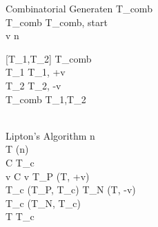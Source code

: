 


\begin{pseudocode}{Combinatorial Generate}{n}
	T_{comb} \GETS \emptyset \\
	T_{comb} \GETS {}T_{comb}, start\text{)} \\ 

	\FOR v   n \DO
		\BEGIN
		
		[T_1,T_2] \GETS {} T_{comb}\text{)}\\
		T_1 \GETS {}T_1, +v \text{)}\\
		T_2 \GETS {}T_2, -v \text{)}\\
		T_{comb} \GETS {}T_1,T_2\text{)}\\
	\END
	\\
\end{pseudocode}


\begin{pseudocode}{Lipton's Algorithm}{\phi}
n  \phi \\

T \GETS {}(n) \\
\FOREACH {} C  \phi \DO
	\BEGIN
	T_c \GETS \emptyset \\
	\FOREACH {} v  C \DO
		\BEGIN
			\IF v  \THEN
				\BEGIN
					T_P \GETS {}(T, +v)\\
					T_c \GETS {}(T_P, T_c)						
				\END
			\ELSE
				\BEGIN
					T_N \GETS {}(T, -v)\\
					T_c \GETS {}(T_N, T_c)						
				\END
		\END
	\\
	T \GETS T_c\\
	\END
\\
\end{pseudocode}
